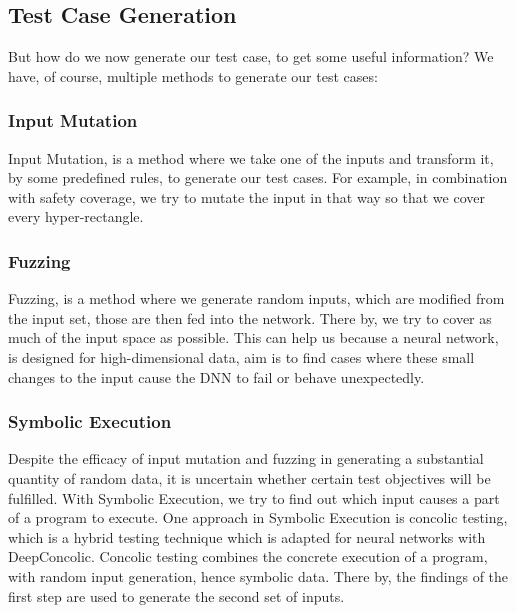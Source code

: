 \subsection*{Test Case Generation}
But how do we now generate our test case, to get some useful information?
We have, of course, multiple methods to generate our test cases:

\subsubsection{Input Mutation}
Input Mutation, is a method where we take one of the inputs and transform it, by some predefined rules, to generate our test cases.
For example, in combination with safety coverage, we try to mutate the input in that way so that we cover every hyper-rectangle.
\subsubsection{Fuzzing}
Fuzzing, is a method where we generate random inputs, which are modified from the input set, those are then fed into the network.
There by, we try to cover as much of the input space as possible.
This can help us because a neural network, is designed for high-dimensional data, aim is to find cases where these small changes to the input cause the DNN to fail or behave unexpectedly.

\subsubsection{Symbolic Execution}
Despite the efficacy of input mutation and fuzzing in generating a substantial quantity of random data, it is uncertain whether certain test objectives will be fulfilled.
With Symbolic Execution, we try to find out which input causes a part of a program to execute.
One approach in Symbolic Execution is concolic testing, which is a hybrid testing technique which is adapted for neural networks with DeepConcolic.
Concolic testing combines the concrete execution of a program, with random input generation, hence symbolic data.
There by, the findings of the first step are used to generate the second set of inputs.

